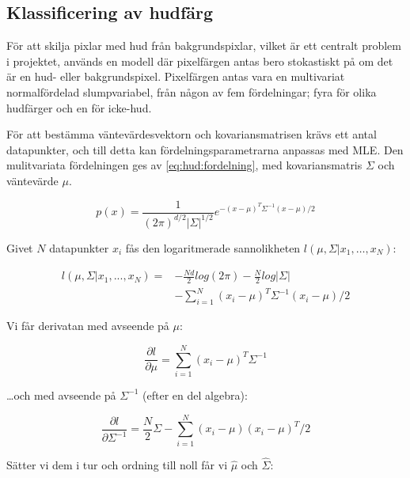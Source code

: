 \documentclass[../rapport_MVEX01-11-05]{subfiles}
\begin{document}
\subsection{Klassificering av hudfärg}

För att skilja pixlar med hud från bakgrundspixlar, vilket är ett
centralt problem i projektet, används en modell där pixelfärgen antas
bero stokastiskt på om det är en hud- eller
bakgrundspixel. Pixelfärgen antas vara en multivariat normalfördelad
slumpvariabel, från någon av fem fördelningar; fyra för olika
hudfärger och en för icke-hud.

För att bestämma väntevärdesvektorn och kovariansmatrisen krävs ett
antal datapunkter, och till detta kan fördelningsparametrarna
anpassas med MLE. Den mulitvariata fördelningen ges av
\eqref{eq:hud:fordelning}, med kovariansmatris
$\Sigma$ och väntevärde $\mu$.

\begin{equation}
  \label{eq:hud:fordelning}
  p(x)=\frac{1}{(2\pi)^{d/2}|\Sigma|^{1/2}}e^{-(x-\mu)^T\Sigma^{-1}(x-\mu)/2}
\end{equation}

Givet $N$ datapunkter $x_i$ fås den logaritmerade sannolikheten $l(\mu,\Sigma|x_1,{\ldots} ,x_N)$:

\begin{equation}
  \label{eq:hud:logaritmerad}
  \begin{aligned}
  l(\mu,\Sigma|x_1,...,x_N) = &-\frac{Nd}{2}log(2\pi)-\frac{N}{2}log|\Sigma|\\
                              &-\sum_{i=1}^N(x_i-\mu)^T\Sigma^{-1}(x_i-\mu)/2
  \end{aligned}
\end{equation}

Vi får derivatan med avseende på $\mu$:

\begin{equation}
  \label{eq:hud:derivmu}
  \frac{\partial l}{\partial \mu}=\sum_{i=1}^N(x_i-\mu)^T\Sigma^{-1}
\end{equation}

{\ldots}och med avseende på $\Sigma^{-1}$ (efter en del algebra):

\begin{equation}
  \label{eq:hud:derivsigma}
  \frac{\partial l}{\partial \Sigma^{-1}}=\frac{N}{2}\Sigma -\sum_{i=1}^N(x_i-\mu)(x_i-\mu)^T/2
\end{equation}

Sätter vi dem i tur och ordning till noll får vi $\hat\mu$ och $\hat\Sigma$:
\end{document}

